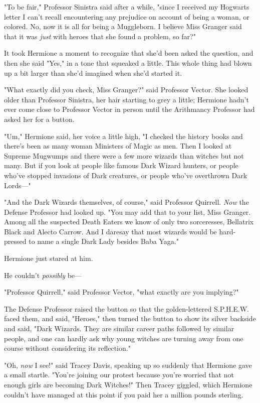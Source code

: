 "To be fair," Professor Sinistra said after a while, "since I received my
Hogwarts letter I can't recall encountering any prejudice on account of being a
woman, or colored. No, now it is all for being a Muggleborn. I believe Miss
Granger said that it was \emph{just} with heroes that she found a problem, so
far?"

It took Hermione a moment to recognize that she'd been asked the question, and
then she said "Yes," in a tone that squeaked a little. This whole thing had
blown up a bit larger than she'd imagined when she'd started it.

"What exactly did you check, Miss Granger?" said Professor Vector. She looked
older than Professor Sinistra, her hair starting to grey a little; Hermione
hadn't ever come close to Professor Vector in person until the Arithmancy
Professor had asked her for a button.

"Um," Hermione said, her voice a little high, "I checked the history books and
there's been as many woman Ministers of Magic as men. Then I looked at Supreme
Mugwumps and there were a few more wizards than witches but not many. But if
you look at people like famous Dark Wizard hunters, or people who've stopped
invasions of Dark creatures, or people who've overthrown Dark Lords\mbox{---}"

"And the Dark Wizards themselves, of course," said Professor Quirrell.
\emph{Now} the Defense Professor had looked up. "You may add that to your list,
Miss Granger. Among all the suspected Death Eaters we know of only two
sorceresses, Bellatrix Black and Alecto Carrow. And I daresay that most wizards
would be hard-pressed to name a single Dark Lady besides Baba Yaga."

Hermione just stared at him.

He couldn't \emph{possibly} be---

"Professor Quirrell," said Professor Vector, "what exactly are you implying?"

The Defense Professor raised the button so that the golden-lettered S.P.H.E.W.
faced them, and said, "Heroes," then turned the button to show its silver
backside and said, "Dark Wizards. They are similar career paths followed by
similar people, and one can hardly ask why young witches are turning away from
one course without considering its reflection."

"Oh, \emph{now} I see!" said Tracey Davis, speaking up so suddenly that
Hermione gave a small startle. "You're joining our protest because you're
worried that not enough girls are becoming Dark Witches!" Then Tracey giggled,
which Hermione couldn't have managed at this point if you paid her a million
pounds sterling.

